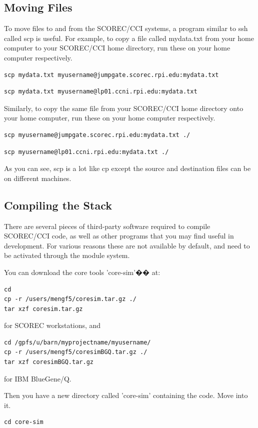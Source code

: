 \documentclass{article}
\begin{document}
\subsection{Moving Files}
\label{ch:1.3}
To move files to and from the SCOREC/CCI systems, a program similar to ssh called scp is useful. For example, to copy a file called mydata.txt from your home computer to your SCOREC/CCI home directory, run these on your home computer respectively.
\begin{lstlisting}
scp mydata.txt myusername@jumpgate.scorec.rpi.edu:mydata.txt
\end{lstlisting}
\begin{lstlisting} 
scp mydata.txt myusername@lp01.ccni.rpi.edu:mydata.txt
\end{lstlisting}

Similarly, to copy the same file from your SCOREC/CCI home directory onto your home computer, run these on your home computer respectively.

\begin{lstlisting}
scp myusername@jumpgate.scorec.rpi.edu:mydata.txt ./
\end{lstlisting}
\begin{lstlisting} 
scp myusername@lp01.ccni.rpi.edu:mydata.txt ./
\end{lstlisting} 
As you can see, scp is a lot like cp except the source and destination files can be on different machines.

\subsection{Compiling the Stack}
\label{ch:1.4}
There are several pieces of third-party software required to compile SCOREC/CCI code, as well as other programs that you may find useful in development. For various reasons these are not available by default, and need to be activated through the module system. 

You can download the core tools 'core-sim'�� at:

\begin{lstlisting}
cd
cp -r /users/mengf5/coresim.tar.gz ./
tar xzf coresim.tar.gz
\end{lstlisting}
for SCOREC workstations, and 
\begin{lstlisting}
cd /gpfs/u/barn/myprojectname/myusername/
cp -r /users/mengf5/coresimBGQ.tar.gz ./
tar xzf coresimBGQ.tar.gz
\end{lstlisting}
for IBM BlueGene/Q.

Then you have a new directory called 'core-sim' containing the code. Move into it.
\begin{lstlisting}
cd core-sim
\end{lstlisting}
\end{document}
